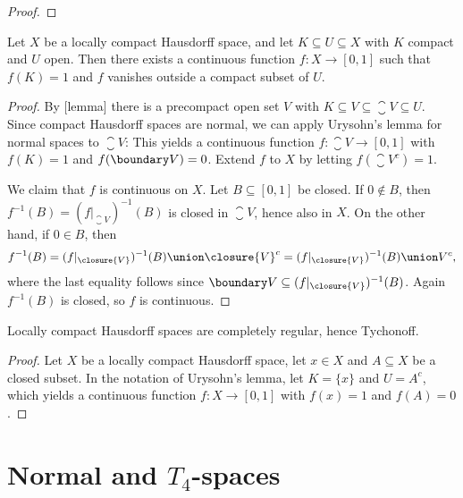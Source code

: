 \documentclass[article, a4paper, 11pt, oneside]{memoir}
\numberwithin{equation}{chapter}
\newcommand{\preim}{^{-1}}
\begin{document}
\begin{proof}
    
\end{proof}


\begin{theorem}
    Let $X$ be a locally compact Hausdorff space, and let $K \subseteq U \subseteq X$ with $K$ compact and $U$ open. Then there exists a continuous function $f \colon X \to [0,1]$ such that $f(K) = 1$ and $f$ vanishes outside a compact subset of $U$.
\end{theorem}

\begin{proof}
    By [lemma] there is a precompact open set $V$ with $K \subseteq V \subseteq \closure{V} \subseteq U$. Since compact Hausdorff spaces are normal, we can apply Urysohn's lemma for normal spaces to $\closure{V}$: This yields a continuous function $f \colon \closure{V} \to [0,1]$ with $f(K) = 1$ and $f(\boundary V) = 0$. Extend $f$ to $X$ by letting $f(\closure{V}^c) = 1$.

    We claim that $f$ is continuous on $X$. Let $B \subseteq [0,1]$ be closed. If $0 \not\in B$, then $f\preim(B) = (f|_{\closure{V}})\preim(B)$ is closed in $\closure{V}$, hence also in $X$. On the other hand, if $0 \in B$, then
    \begin{equation*}
        f\preim(B)
            = (f|_{\closure{V}})\preim(B) \union \closure{V}^c
            = (f|_{\closure{V}})\preim(B) \union V^c,
    \end{equation*}
    where the last equality follows since $\boundary V \subseteq (f|_{\closure{V}})\preim(B)$. Again $f\preim(B)$ is closed, so $f$ is continuous.
\end{proof}


\begin{corollary}
    Locally compact Hausdorff spaces are completely regular, hence Tychonoff.
\end{corollary}

\begin{proof}
    Let $X$ be a locally compact Hausdorff space, let $x \in X$ and $A \subseteq X$ be a closed subset. In the notation of Urysohn's lemma, let $K = \{x\}$ and $U = A^c$, which yields a continuous function $f \colon X \to [0,1]$ with $f(x) = 1$ and $f(A) = 0$.
\end{proof}



\chapter[Normal and T4-spaces]{Normal and $T_4$-spaces}
\end{document}

